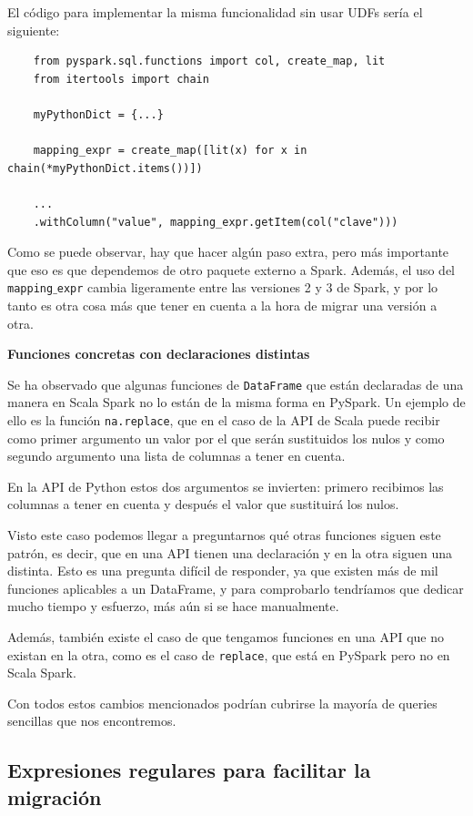 \documentclass[12pt,twoside,titlepage]{report}
\begin{document}
El código para implementar la misma funcionalidad sin usar UDFs sería el siguiente:

\begin{lstlisting}
	from pyspark.sql.functions import col, create_map, lit
	from itertools import chain
	
	myPythonDict = {...}
	
	mapping_expr = create_map([lit(x) for x in chain(*myPythonDict.items())])
	
	...
	.withColumn("value", mapping_expr.getItem(col("clave")))
\end{lstlisting}

Como se puede observar, hay que hacer algún paso extra, pero más importante que eso es que dependemos de otro paquete externo a Spark. Además, el uso del \texttt{mapping$\_$expr} cambia ligeramente entre las versiones 2 y 3 de Spark, y por lo tanto es otra cosa más que tener en cuenta a la hora de migrar una versión a otra.

\textbf{Funciones concretas con declaraciones distintas}

Se ha observado que algunas funciones de \texttt{DataFrame} que están declaradas de una manera en Scala Spark no lo están de la misma forma en PySpark. Un ejemplo de ello es la función \texttt{na.replace}, que en el caso de la API de Scala puede recibir como primer argumento un valor por el que serán sustituidos los nulos y como segundo argumento una lista de columnas a tener en cuenta.

En la API de Python estos dos argumentos se invierten: primero recibimos las columnas a tener en cuenta y después el valor que sustituirá los nulos.

Visto este caso podemos llegar a preguntarnos qué otras funciones siguen este patrón, es decir, que en una API tienen una declaración y en la otra siguen una distinta. Esto es una pregunta difícil de responder, ya que existen más de mil funciones aplicables a un DataFrame, y para comprobarlo tendríamos que dedicar mucho tiempo y esfuerzo, más aún si se hace manualmente.

Además, también existe el caso de que tengamos funciones en una API que no existan en la otra, como es el caso de \texttt{replace}, que está en PySpark pero no en Scala Spark.

Con todos estos cambios mencionados podrían cubrirse la mayoría de queries sencillas que nos encontremos.

\subsection{Expresiones regulares para facilitar la migración}
\end{document}
